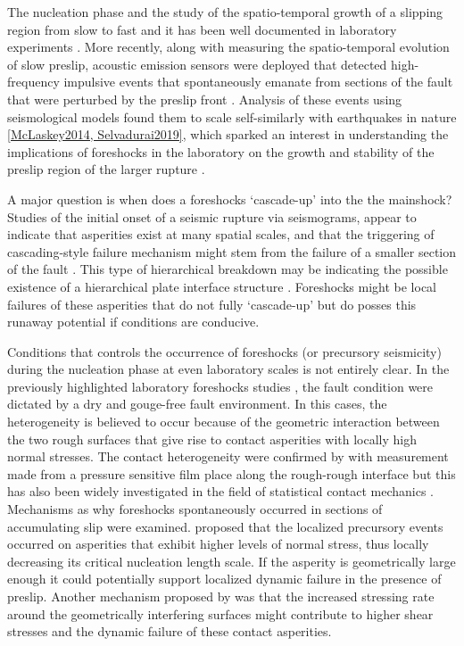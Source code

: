 \documentclass[preprint,1p, 10pt,authoryear]{elsarticle}
\begin{document}
The nucleation phase and the study of the spatio-temporal growth of a slipping region from slow to fast and it has been well documented in laboratory experiments \citep{Dieterich1978, Okubu1984, Yamashita1992, Ohnaka1999, Nielsen2010, Latour2013, Fukuyama2018, Zhuo2018, McLaskey2017, Ke2018, Buijze2020}. More recently, along with measuring the spatio-temporal evolution of slow preslip, acoustic emission sensors were deployed that detected high-frequency impulsive events that spontaneously emanate from sections of the fault that were perturbed by the preslip front \citep{Shengli2002, McLaskey2013, Selvadurai2015}.  Analysis of these events using seismological models found them to scale self-similarly with earthquakes in nature \ref{McLaskey2014, Selvadurai2019}, which sparked an interest in understanding the implications of foreshocks in the laboratory on the growth and stability of the preslip region of the larger rupture \citep{McLaskey2019}.  

A major question is when does a foreshocks `cascade-up' into the the mainshock? Studies of the initial onset of a seismic rupture via seismograms, appear to indicate that asperities exist at many spatial scales, and that the triggering of cascading-style failure mechanism might stem from the failure of a smaller section of the fault \citep{Okuda2018, Ide2019}. This type of hierarchical breakdown may be indicating the possible existence of a hierarchical plate interface structure \citep{Ide2005, Aochi2014, Aochi2017}.  Foreshocks might be local failures of these asperities that do not fully `cascade-up' but do posses this runaway potential if conditions are conducive. 

Conditions that controls the occurrence of foreshocks (or precursory seismicity) during the nucleation phase at even laboratory scales is not entirely clear. In the previously highlighted laboratory foreshocks studies \citep{McLaskey2013, Selvadurai2015}, the fault condition were dictated by a dry and gouge-free fault environment.  In this cases, the heterogeneity is believed to occur because of the geometric interaction between the two rough surfaces that give rise to contact asperities with locally high normal stresses.  The contact heterogeneity were confirmed by \citet{Selvadurai2017} with measurement made from a pressure sensitive film place along the rough-rough interface but this has also been widely investigated in the field of statistical contact mechanics \citep[e.g.][]{Johnson1985, Persson2006}. Mechanisms as why foreshocks spontaneously occurred in sections of accumulating slip were examined.  \citet{Selvadurai2017} proposed that the localized precursory events occurred on asperities that exhibit higher levels of normal stress, thus locally decreasing its critical nucleation length scale. If the asperity is geometrically large enough it could potentially support localized dynamic failure in the presence of preslip. Another mechanism proposed by \citet{McLaskey2013} was that the increased stressing rate around the geometrically interfering surfaces might contribute to higher shear stresses and the dynamic failure of these contact asperities.  
\end{document}
